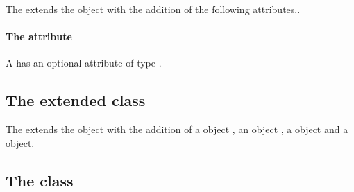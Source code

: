 
The \SpatialProcessesPackage extends the  object with the
addition of
the following attributes..

\paragraph{The \fixttspace{} attribute}

A \Species has an optional attribute  of type
.


\subsection{The extended  class}
\label{extended-parameter-class}




The \SpatialProcessesPackage extends the  object with
the addition of
a \SpatialSymbolReference object
, an \AdvectionCoefficient object
, a \BoundaryCondition object
and a \DiffusionCoefficient object.

\subsection{The  class}
\label{spatialsymbolreference-class}



